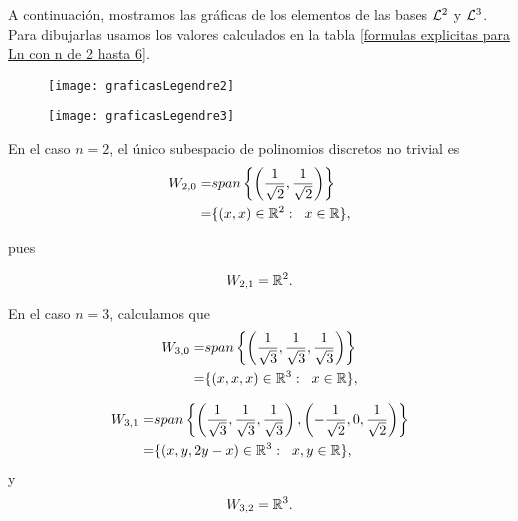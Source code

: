 \begin{comment}
{\Huge{
$\cali{L}^{\textcolor{ameCyanO}{n}, \textcolor{ameVerde}{k}} =
\left(
\cali{L}^{\textcolor{ameCyanO}{n}, \textcolor{ameVerde}{k}}_{
\textcolor{ameGris}{m}}
\right)_{m=0}^{n-1} \in \IR^{n }
$
}}
\end{comment}

\begin{ejemplo}
A continuación, mostramos las gráficas de los
elementos de las bases $\mathcal{L}^{2}$ y $\mathcal{L}^{3}$.
Para dibujarlas usamos los valores
calculados en la tabla
\ref{formulas explicitas para Ln con n de 2 hasta 6}.

\begin{figure}[H]
	\centering
	\texttt{[image: graficasLegendre2]} 
\end{figure}	


\begin{figure}[H]
	\centering
	\texttt{[image: graficasLegendre3]} 
\end{figure}	 




En el caso $n=2$, el único subespacio de polinomios
discretos no trivial es 
\begin{align*}
W_{2,0}= & span \left\{ 
\left(\frac{1}{\sqrt2}, \frac{1}{\sqrt2} \right) \right\} \\
= & \{ (x,x) \in \mathbb{R}^{2}: \hspace{0.2cm} x \in \mathbb{R} \},
\end{align*}

pues

\begin{equation*}
\label{eq1: 1Dic}
W_{2,1}= \mathbb{R}^{2}.
\end{equation*}


En el caso $n=3$, calculamos que
\begin{align*}
W_{3,0}= & span \left\{
\left( \frac{1}{\sqrt3}, \frac{1}{\sqrt3},
\frac{1}{\sqrt3} \right) \right\}  \\
= & \{ (x,x,x) \in \mathbb{R}^{3}: \hspace{0.2cm} x \in \mathbb{R} \},
\end{align*}

\begin{align}
\label{eq2: 1Dic}
W_{3,1}= & span \left\{ \left( \frac{1}{\sqrt3}, \frac{1}{\sqrt3},
\frac{1}{\sqrt3} \right) ,
\left( -\frac{1}{\sqrt2}, 0,  \frac{1}{\sqrt2} \right) \right\}
\nonumber \\
= & \{ (x,y,2y-x) \in \mathbb{R}^{3}: \hspace{0.2cm} x,y \in \mathbb{R} \},
\end{align}
y
\[
W_{3,2}=\mathbb{R}^{3}.
\]


\end{ejemplo}
